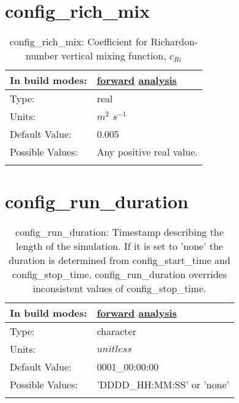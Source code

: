 \section[config\_rich\_mix]{config\_rich\_mix}
\label{sec:nm_sec_config_rich_mix}
\begin{center}
\begin{longtable}{| p{2.0in} || p{4.0in} |}
    \hline
    In build modes: & \hyperref[subsec:forward_nm_tab_vmix_rich]{forward} \hyperref[subsec:analysis_nm_tab_vmix_rich]{analysis} \\
    \hline
    Type: & real \\
    \hline
    Units: & $m^2$ $s^{-1}$ \\
    \hline
    Default Value: & 0.005 \\
    \hline
    Possible Values: & Any positive real value. \\
    \hline
    \caption{config\_rich\_mix:  Coefficient for Richardon-number vertical mixing function,  $c_{Ri}$ }
\end{longtable}
\end{center}
\section[config\_run\_duration]{config\_run\_duration}
\label{sec:nm_sec_config_run_duration}
\begin{center}
\begin{longtable}{| p{2.0in} || p{4.0in} |}
    \hline
    In build modes: & \hyperref[subsec:forward_nm_tab_time_management]{forward} \hyperref[subsec:analysis_nm_tab_time_management]{analysis} \\
    \hline
    Type: & character \\
    \hline
    Units: & $unitless$ \\
    \hline
    Default Value: & 0001\_00:00:00 \\
    \hline
    Possible Values: & 'DDDD\_HH:MM:SS' or 'none' \\
    \hline
    \caption{config\_run\_duration: Timestamp describing the length of the simulation. If it is set to 'none' the duration is determined from config\_start\_time and config\_stop\_time. config\_run\_duration overrides inconsistent values of config\_stop\_time.}
\end{longtable}
\end{center}
